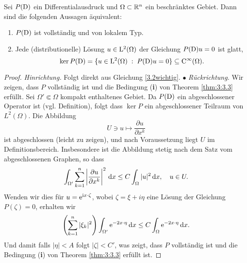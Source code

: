 %
%
%
%

\begin{thm}
Sei $P(\mathrm D)$ ein Differentialausdruck und $\Omega\subset\mathbb R^n$ ein beschränktes Gebiet. Dann sind die folgenden Aussagen äquivalent:
\begin{enumerate}
\item $P(\mathrm D)$ ist vollständig und von lokalem Typ.
\item Jede (distributionelle) Lösung $u\in\mathrm L^2(\Omega)$ der Gleichung $P(\mathrm D)u=0$ ist glatt,
\begin{equation}
    \ker P(\mathrm D) = \{ u\in\mathrm L^2(\Omega) \;:\; P(\mathrm D)u=0\} \subseteq\mathrm C^\infty(\Omega).
\end{equation}
\end{enumerate}
\end{thm}
\begin{proof}
\emph{Hinrichtung.} Folgt direkt aus Gleichung \eqref{3.2wichtig}. $\bullet$ \qquad
\emph{Rückrichtung.} Wir zeigen, dass $P$ vollständig ist und die Bedingung ({\bf i}) von Theorem \ref{thm:3:3.3} erfüllt.   Sei $\Omega'\Subset \Omega$ kompakt enthaltenes Gebiet. Da $P(\mathrm D)$ ein abgeschlossener Operator ist (vgl. Definition), folgt dass $\ker P$ ein abgeschlossener Teilraum von $L^2(\Omega)$. Die Abbildung
\begin{equation}
U\ni u \mapsto \frac{\partial u}{\partial x^k}
\end{equation}  
ist abgeschlossen (leicht zu zeigen), und nach Voraussetzung liegt $U$ im Definitionsbereich.  Insbesondere ist die Abbildung stetig nach dem Satz vom abgeschlossenen Graphen, so dass
\begin{equation}
\int_{\Omega'} \sum_{k=1}^n \left | \frac{\partial u}{\partial x^k}\right |^2\,\mathrm d x \le C \int_\Omega |u|^2\,\mathrm d x, \quad u\in U.
\end{equation}
Wenden wir dies für $u=\mathrm e^{\mathrm i x\cdot \zeta}$, wobei $\zeta = \xi + i \eta$ eine Lösung der Gleichung $P(\zeta)=0$, erhalten wir
\begin{equation}
\left (\sum_{k=1}^n |\xi_k|^2 \right ) \int_{\Omega'} \mathrm e^{-2x\cdot \eta}\,\mathrm d x \le C\int_\Omega \mathrm e^{-2 x\cdot \eta}\,\mathrm d x.
\end{equation}
Und damit falls  $|\eta|<A$ folgt $|\zeta|<C'$, was zeigt, dass $P$ vollständig ist und die Bedingung ({\bf i}) von Theorem \ref{thm:3:3.3} erfüllt ist. 
\end{proof}
